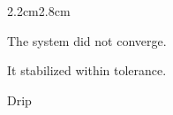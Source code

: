 \begin{center}

\medskip


\medskip

\end{center}

\vspace{3em}

\begin{adjustwidth}{2.2cm}{2.8cm}

The system did not converge.

\medskip

It stabilized within tolerance.

\vspace{3em}


\vspace{3em}

\end{adjustwidth}

\begin{center}
Drip
\end{center}

\vspace{2em}

\begin{center}
\end{center}
